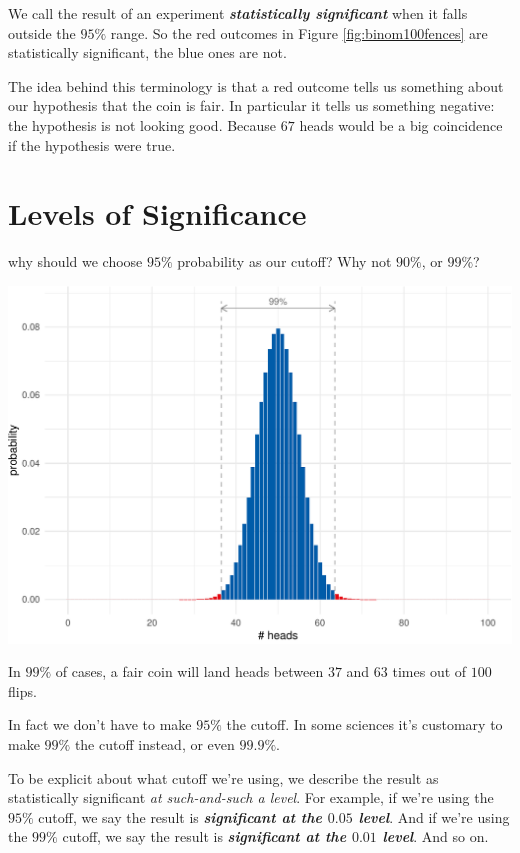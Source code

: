 \documentclass[justified]{tufte-book}
\theoremstyle{definition}
\theoremstyle{definition}
\theoremstyle{definition}
\theoremstyle{remark}
\begin{document}
We call the result of an experiment \textbf{\emph{statistically significant}} when it falls outside the \(95\%\) range. So the red outcomes in Figure \ref{fig:binom100fences} are statistically significant, the blue ones are not.

The idea behind this terminology is that a red outcome tells us something about our hypothesis that the coin is fair. In particular it tells us something negative: the hypothesis is not looking good. Because \(67\) heads would be a big coincidence if the hypothesis were true.

\hypertarget{levels-of-significance}{%
\section{Levels of Significance}\label{levels-of-significance}}

 why should we choose \(95\%\) probability as our cutoff? Why not \(90\%\), or \(99\%\)?

\begin{marginfigure}
\includegraphics{_main_files/figure-latex/binom100fences99-1} \caption[In $99\%$ of cases, a fair coin will land heads between $37$ and $63$ times out of $100$ flips]{In $99\%$ of cases, a fair coin will land heads between $37$ and $63$ times out of $100$ flips.}\label{fig:binom100fences99}
\end{marginfigure}

In fact we don't have to make \(95\%\) the cutoff. In some sciences it's customary to make \(99\%\) the cutoff instead, or even \(99.9\%\).

To be explicit about what cutoff we're using, we describe the result as statistically significant \emph{at such-and-such a level}. For example, if we're using the \(95\%\) cutoff, we say the result is \textbf{\emph{significant at the \(0.05\) level}}. And if we're using the \(99\%\) cutoff, we say the result is \textbf{\emph{significant at the \(0.01\) level}}. And so on.
\end{document}
